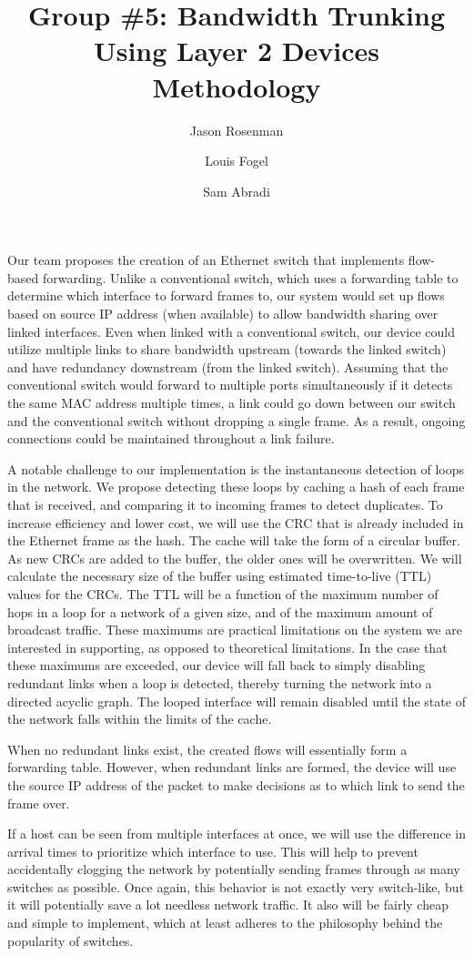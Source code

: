\documentclass{article}
\title{Group \#5: Bandwidth Trunking Using Layer 2 Devices\\Methodology}
\author{Jason Rosenman \and Louis Fogel \and Sam Abradi}
\date{}
\begin{document}
\maketitle
	Our team proposes the creation of an Ethernet switch that implements flow-based forwarding.
	Unlike a conventional switch, which uses a forwarding table to determine which interface to forward frames to, our system would set up flows based on source IP address (when available) to allow bandwidth sharing over linked interfaces.
	Even when linked with a conventional switch, our device could utilize multiple links to share bandwidth upstream (towards the linked switch) and have redundancy downstream (from the linked switch).
	Assuming that the conventional switch would forward to multiple ports simultaneously if it detects the same MAC address multiple times, a link could go down between our switch and the conventional switch without dropping a single frame.
	As a result, ongoing connections could be maintained throughout a link failure.

	A notable challenge to our implementation is the instantaneous detection of loops in the network.
	We propose detecting these loops by caching a hash of each frame that is received, and comparing it to incoming frames to detect duplicates.
	To increase efficiency and lower cost, we will use the CRC that is already included in the Ethernet frame as the hash.
	The cache will take the form of a circular buffer.
	As new CRCs are added to the buffer, the older ones will be overwritten.
	We will calculate the necessary size of the buffer using estimated time-to-live (TTL) values for the CRCs.
	The TTL will be a function of the maximum number of hops in a loop for a network of a given size, and of the maximum amount of broadcast traffic.
	These maximums are practical limitations on the system we are interested in supporting, as opposed to theoretical limitations.
	In the case that these maximums are exceeded, our device will fall back to simply disabling redundant links when a loop is detected, thereby turning the network into a directed acyclic graph.
	The looped interface will remain disabled until the state of the network falls within the limits of the cache.
	
	When no redundant links exist, the created flows will essentially form a forwarding table.
	However, when redundant links are formed, the device will use the source IP address of the packet to make decisions as to which link to send the frame over.

	If a host can be seen from multiple interfaces at once, we will use the difference in arrival times to prioritize which interface to use.
	This will help to prevent accidentally clogging the network by potentially sending frames through as many switches as possible. Once again, this behavior is not exactly very switch-like, but it will potentially save a lot needless network traffic. 
	It also will be fairly cheap and simple to implement, which at least adheres to the philosophy behind the popularity of switches.
\end{document}

